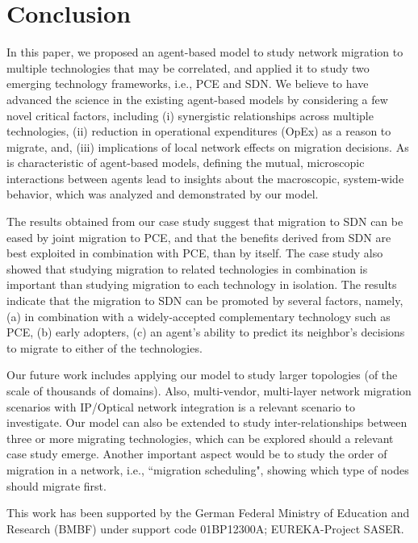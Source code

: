 \documentclass[smallextended]{svjour3}
\begin{document}
\section{Conclusion} \label{sec:conclusion}

\par In this paper, we proposed an agent-based model to study network migration to
multiple technologies that may be correlated, and applied it to study two
emerging technology frameworks, i.e.,  PCE and SDN. We believe to have advanced the science in the existing agent-based models by considering a few novel  critical factors, including (i) synergistic relationships across multiple
technologies, (ii) reduction in operational expenditures (OpEx) as a reason to
migrate, and, (iii) implications of local network effects on migration
decisions. As is characteristic of
agent-based models, defining the mutual, microscopic interactions between
agents lead to insights about the macroscopic, system-wide behavior, which was
analyzed and demonstrated by our model.

\par The results obtained from our case study suggest that migration to SDN can be
eased by joint migration to PCE, and that the benefits derived from SDN are best
exploited in combination with PCE, than by itself. The case study also showed
that studying migration to related technologies in combination is important than
studying migration to each technology in isolation. The results indicate that
the migration to SDN can be promoted by several factors, namely, (a) in combination with a widely-accepted complementary technology such as PCE, (b) early adopters,
(c) an agent's ability to predict its neighbor's decisions to migrate to either of the technologies.

\par Our future work includes applying our model to study larger
topologies (of the scale of thousands of domains). Also,
multi-vendor, multi-layer network migration scenarios with IP/Optical network
integration is a relevant scenario to investigate. Our model can also be
extended to study inter-relationships between three or more migrating
technologies, which can be explored should a relevant case study emerge. Another important aspect would be to study
the order of migration in a network, i.e.,  ``migration scheduling", showing
which type of nodes should migrate first.



\begin{acknowledgements} \label{sec:ack} 
This work has been supported by the
German Federal Ministry of Education and Research (BMBF) under support code
01BP12300A; EUREKA-Project SASER.
\end{acknowledgements}



\end{document}
